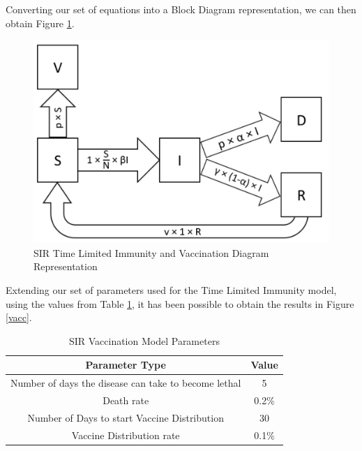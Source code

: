 Converting our set of equations into a Block Diagram representation, we can then obtain Figure \ref{dvacc}.

\begin{figure}[ht!]%
    \centering
    \includegraphics[width=0.8\linewidth]{latex/images/dvacc.pdf}
    \caption{SIR Time Limited Immunity and Vaccination Diagram Representation}
    \label{dvacc}
\end{figure}


Extending our set of parameters used for the Time Limited Immunity model, using the values from Table \ref{table:2}, it has been possible to obtain the results in Figure \ref{vacc}.

{
\begin{table}[h!]
\centering
\begin{tabular}{|c|c|}
\hline
Parameter Type & Value \\
\hline
Number of days the disease can take to become lethal & 5  \\
Death rate & 0.2\%  \\
Number of Days to start Vaccine Distribution & 30  \\
Vaccine Distribution rate & 0.1\%  \\
\hline
\end{tabular}
\caption{SIR Vaccination Model Parameters}
\label{table:2}
\end{table}
}

